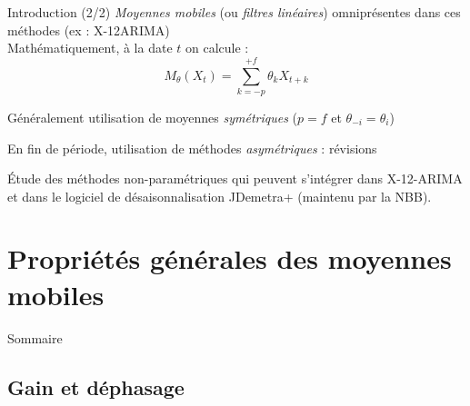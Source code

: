 \documentclass[10pt,xcolor=table,color={dvipsnames,usenames},ignorenonframetext,usepdftitle=false,french]{beamer}
\newcommand\1{\mathds{1}}
\begin{document}
\begin{frame}{Introduction (2/2)}
\protect\hypertarget{introduction-22}{}
\emph{Moyennes mobiles} (ou \emph{filtres linéaires}) omniprésentes dans
ces méthodes (ex : X-12ARIMA)\\
Mathématiquement, à la date \(t\) on calcule : \[
M_\theta(X_t)=\sum_{k=-p}^{+f}\theta_kX_{t+k}
\]

\pause \bigskip

\faArrowCircleRight{} Généralement utilisation de moyennes
\emph{symétriques} (\(p=f\) et \(\theta_{-i}=\theta_i\))

\bigskip

\faArrowCircleRight{} En fin de période, utilisation de méthodes
\emph{asymétriques} : révisions

\pause

\bigskip

\faArrowCircleRight{} Étude des méthodes non-paramétriques qui peuvent
s'intégrer dans X-12-ARIMA et dans le logiciel de désaisonnalisation
JDemetra+ (maintenu par la NBB).
\end{frame}

\hypertarget{propriuxe9tuxe9s-guxe9nuxe9rales-des-moyennes-mobiles}{%
\section{Propriétés générales des moyennes
mobiles}\label{propriuxe9tuxe9s-guxe9nuxe9rales-des-moyennes-mobiles}}

\begin{frame}[noframenumbering]{Sommaire}
\protect\hypertarget{sommaire}{}
\end{frame}

\hypertarget{gain-et-duxe9phasage}{%
\subsection{Gain et déphasage}\label{gain-et-duxe9phasage}}
\end{document}
